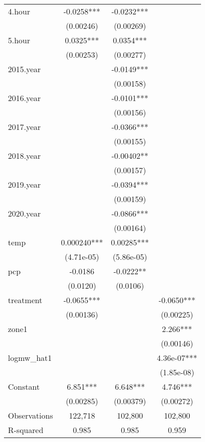 \begin{longtable}{lccc}
4.hour & -0.0258*** & -0.0232*** &  \\
& (0.00246) & (0.00269) &  \\
5.hour & 0.0325*** & 0.0354*** &  \\
& (0.00253) & (0.00277) &  \\
2015.year & & -0.0149*** & \\
& & (0.00158) & \\
2016.year & & -0.0101*** & \\
& & (0.00156) & \\
2017.year & & -0.0366*** & \\
& & (0.00155) & \\
2018.year & & -0.00402** & \\
& & (0.00157) & \\
2019.year & & -0.0394*** & \\
& & (0.00159) & \\
2020.year & & -0.0866*** & \\
& & (0.00164) & \\
temp & 0.000240*** & 0.00285*** & \\
& (4.71e-05) & (5.86e-05) & \\
pcp & -0.0186 & -0.0222** & \\
& (0.0120) & (0.0106) & \\
treatment & -0.0655*** & & -0.0650*** \\
& (0.00136) & & (0.00225) \\
zone1 & & & 2.266*** \\
& & & (0.00146) \\
logmw\_hat1 & & & 4.36e-07*** \\
& & & (1.85e-08) \\
Constant & 6.851*** & 6.648*** & 4.746*** \\
& (0.00285) & (0.00379) & (0.00272) \\
\midrule
Observations & 122,718 & 102,800 & 102,800 \\
R-squared & 0.985 & 0.985 & 0.959 \\
\bottomrule
\end{longtable}

